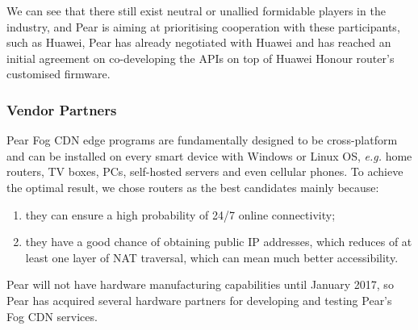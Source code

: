 We can see that there still exist neutral or unallied formidable players in the industry, and Pear is aiming at prioritising cooperation with these participants, such as Huawei, Pear has already negotiated with Huawei and has reached an initial agreement on co-developing the APIs on top of Huawei Honour router's customised firmware. 

\subsubsection{Vendor Partners}
Pear Fog CDN edge programs are fundamentally designed to be cross-platform and can be installed on every smart device with Windows or Linux OS, {\em e.g.} home routers, TV boxes, PCs, self-hosted servers and even cellular phones. To achieve the optimal result, we chose routers as the best candidates mainly because:
\begin{enumerate}
	\item they can ensure a high probability of 24/7 online connectivity;
	\item they have a good chance of obtaining public IP addresses, which reduces of at least one layer of NAT traversal, which can mean much better accessibility. 
\end{enumerate}

Pear will not have hardware manufacturing capabilities until January 2017, so Pear has acquired several hardware partners for developing and testing Pear's Fog CDN services.

